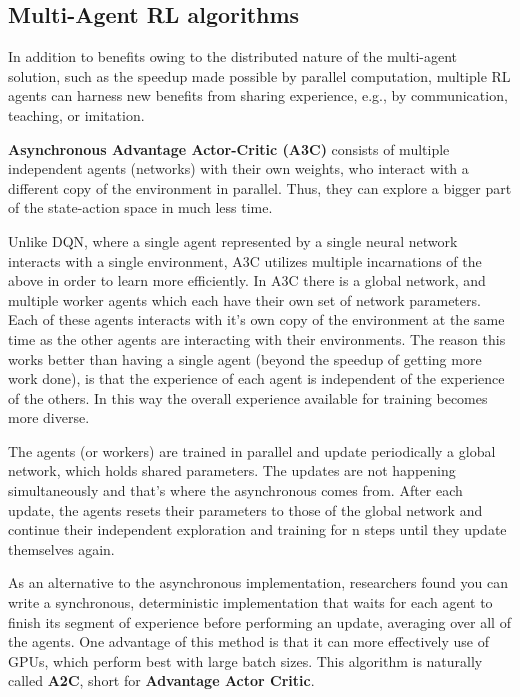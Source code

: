\documentclass[11 pt, twocolumn]{article}
\begin{document}
\subsection{Multi-Agent RL algorithms}
In addition to benefits owing to the distributed nature of the multi-agent solution, such as the speedup made possible by parallel computation, multiple RL agents can harness new benefits from sharing experience, e.g., by communication, teaching, or imitation.

 \textbf{Asynchronous Advantage Actor-Critic (A3C)} consists of multiple independent agents (networks) with their own weights, who interact with a different copy of the environment in parallel. Thus, they can explore a bigger part of the state-action space in much less time.

Unlike DQN, where a single agent represented by a single neural network interacts with a single environment, A3C utilizes multiple incarnations of the above in order to learn more efficiently. In A3C there is a global network, and multiple worker agents which each have their own set of network parameters.
Each of these agents interacts with it’s own copy of the environment at the same time as the other agents are interacting with their environments. The reason this works better than having a single agent (beyond the speedup of getting more work done), is that the experience of each agent is independent of the experience of the others. In this way the overall experience available for training becomes more diverse.

The agents (or workers) are trained in parallel and update periodically a global network, which holds shared parameters. The updates are not happening simultaneously and that’s where the asynchronous comes from. After each update, the agents resets their parameters to those of the global network and continue their independent exploration and training for n steps until they update themselves again.


As an alternative to the asynchronous implementation, researchers found you can write a synchronous, deterministic implementation that waits for each agent to finish its segment of experience before performing an update, averaging over all of the agents. One advantage of this method is that it can more effectively use of GPUs, which perform best with large batch sizes. This algorithm is naturally called \textbf{A2C}, short for \textbf{Advantage Actor Critic}.
\end{document}
